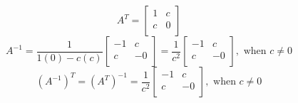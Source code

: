 \documentclass[12pt,letterpaper]{article}
\begin{document}
\begin{enumerate}
\begin{enumerate}
\begin{enumerate}
              \[
                A^T
                =
                \begin{bmatrix}
                   1 &  c \\
                   c &  0 \\
                \end{bmatrix}
              \]
              \[
                A^{-1}
                =
                \frac{1}{1(0) - c(c)}
                \begin{bmatrix}
                  -1 &  c \\
                   c & -0 \\
                \end{bmatrix}
                =
                \frac{1}{c^2}
                \begin{bmatrix}
                  -1 &  c \\
                   c & -0 \\
                \end{bmatrix}
                , \text{ when } c \ne 0
              \]
              \[
                \left(A^{-1}\right)^T
                =
                \left(A^T\right)^{-1}
                =
                \frac{1}{c^2}
                \begin{bmatrix}
                  -1 &  c \\
                   c & -0 \\
                \end{bmatrix}
                , \text{ when } c \ne 0
              \]
          \end{enumerate}
      \end{enumerate}
  \end{enumerate}
\end{document}
